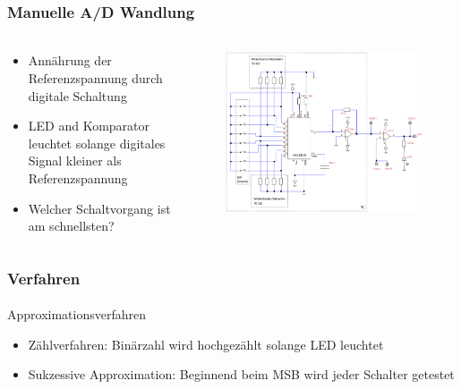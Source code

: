 \begin{frame}
    \frametitle{Manuelle A/D Wandlung}
    \framesubtitle{}
    \begin{columns}[c]
            \begin{block}{}
                \begin{itemize}
                    \item Annährung der Referenzspannung durch digitale
                    Schaltung
                    \item LED and Komparator leuchtet solange digitales Signal
                    kleiner als Referenzspannung
                    \item Welcher Schaltvorgang ist am schnellsten?
                \end{itemize}
            \end{block}
             \begin{figure}[H]
             \begin{center}
                     \includegraphics[scale=0.2]{./img/schaltung/manuelle_dac_0.png}
             \end{center}
             \end{figure}
    \end{columns}
\end{frame}

\begin{frame}
    \frametitle{Verfahren}
    \framesubtitle{}
    \begin{block}{Approximationsverfahren}
        \begin{itemize}
            \item Zählverfahren: Binärzahl wird hochgezählt solange LED
            leuchtet
            \item Sukzessive Approximation: Beginnend beim MSB wird jeder
            Schalter getestet
        \end{itemize}
    \end{block}
\end{frame}

